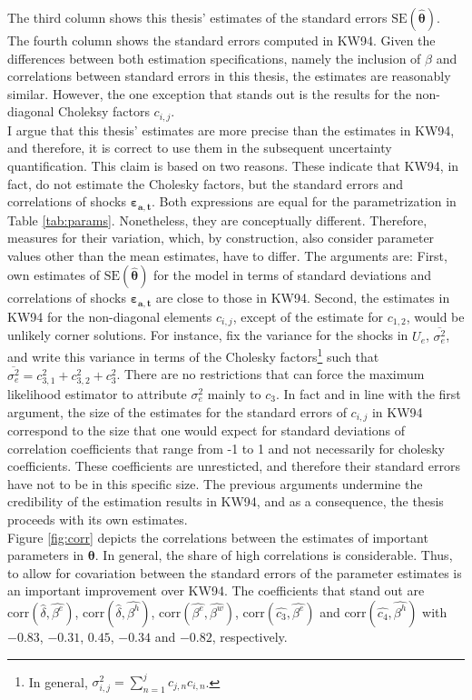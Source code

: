 \documentclass[a4paper,12pt]{article}
\begin{document}
The third column shows this thesis' estimates of the standard errors $\text{SE}(\pmb{\hat{\theta}})$. The fourth column shows the standard errors computed in KW94. Given the differences between both estimation specifications, namely the inclusion of $\beta$ and correlations between standard errors in this thesis, the estimates are reasonably similar. However, the one exception that stands out is the results for the non-diagonal Choleksy factors $c_{i,j}$.\\
\newline
I argue that this thesis' estimates are more precise than the estimates in KW94, and therefore, it is correct to use them in the subsequent uncertainty quantification. This claim is based on two reasons. These indicate that KW94, in fact, do not estimate the Cholesky factors, but the standard errors and correlations of shocks $\pmb{\varepsilon_{a,t}}$. Both expressions are equal for the parametrization in Table \ref{tab:params}. Nonetheless, they are conceptually different. Therefore, measures for their variation, which, by construction, also consider parameter values other than the mean estimates, have to differ. The arguments are: First, own estimates of $\text{SE}(\pmb{\hat{\theta}})$ for the model in terms of standard deviations and correlations of shocks $\pmb{\varepsilon_{a,t}}$ are close to those in KW94. Second, the estimates in KW94 for the non-diagonal elements $c_{i,j}$, except of the estimate for $c_{1,2}$, would be unlikely corner solutions. For instance, fix the variance for the shocks in $U_e$, $\overline{\sigma_e^2}$, and write this variance in terms of the Cholesky factors\footnote{In general, $\sigma_{i,j}^2 = \sum_{n=1}^{j} c_{j,n}c_{i,n}$.} such that $\overline{\sigma_e^2}=c_{3,1}^2+c_{3,2}^2+c_{3}^2$. There are no restrictions that can force the maximum likelihood estimator to attribute $\sigma_e^2$ mainly to $c_{3}$. In fact and in line with the first argument, the size of the estimates for the standard errors of $c_{i,j}$ in KW94 correspond to the size that one would expect for standard deviations of correlation coefficients that range from -1 to 1 and not necessarily for cholesky coefficients. These coefficients are unresticted, and therefore their standard errors have not to be in this specific size. The previous arguments undermine the credibility of the estimation results in KW94, and as a consequence, the thesis proceeds with its own estimates.\\

\noindent
Figure \ref{fig:corr} depicts the correlations between the estimates of important parameters in $\pmb{\theta}$. In general, the share of high correlations is considerable. Thus, to allow for covariation between the standard errors of the parameter estimates is an important improvement over KW94. The coefficients that stand out are $\text{corr}(\hat{\delta},\hat{\beta^e})$, $\text{corr}(\hat{\delta},\hat{\beta^h})$, $\text{corr}(\hat{\beta^e},\hat{\beta^w})$, $\text{corr}(\hat{c_3},\hat{\beta^e})$ and $\text{corr}(\hat{c_4},\hat{\beta^h})$ with $-0.83$, $-0.31$, $0.45$, $-0.34$ and $-0.82$, respectively. 
\end{document}
